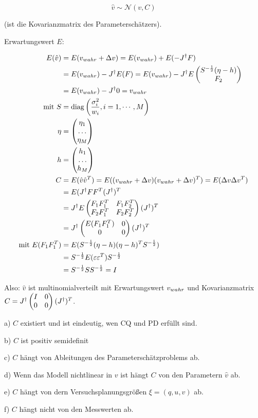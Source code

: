\[ \hat v \sim \mathcal N(v,C) \]

(ist die Kovarianzmatrix des Parameterschätzers).

Erwartungswert $E$:

\begin{align*}
E(\hat v) &= E(v_{wahr} + \Delta v) = E(v_{wahr}) + E(-J^\dagger F) \\
&= E(v_{wahr}) - J^\dagger E(F) = E(v_{wahr}) - J^\dagger E \begin{pmatrix} S^{-\frac 12} (\eta-h) \\ F_2 \end{pmatrix} \\
&= E(v_{wahr}) - J^\dagger 0 = v_{wahr} \\
\text{mit } S &= \mathrm{diag} \left( \frac{\sigma_i^2}{w_i}, i=1,\cdots,M \right) \\
\eta &= \begin{pmatrix} \eta_1 \\ \hdots \\ \eta_M \end{pmatrix} \\
h &= \begin{pmatrix} h_1 \\ \hdots \\ h_M \end{pmatrix} \\
C &= E(\hat v \hat v^T) = E( (v_{wahr} + \Delta v) (v_{wahr} + \Delta v)^T ) = E(\Delta v \Delta v^T) \\
&= E(J^\dagger F F^T (J^\dagger)^T \\
&= J^\dagger E \begin{pmatrix} F_1 F_1^T & F_1 F_2^T \\ F_2 F_1^T & F_2 F_2^T \end{pmatrix} (J^\dagger)^T \\
&= J^\dagger \begin{pmatrix} E(F_1 F_1^T) & 0 \\ 0 & 0 \end{pmatrix} (J^\dagger)^T \\
\text{mit } E(F_1 F_1^T) &= E( S^{-\frac 12} (\eta-h)(\eta-h)^T S^{-\frac 12}) \\
&= S^{-\frac 12} E(\varepsilon \varepsilon^T) S^{-\frac 12 } \\
&= S^{-\frac 12} S S^{-\frac 12} = I \\
\end{align*}

Also: $\hat v$ ist multinomialverteilt mit Erwartungswert $v_{wahr}$ und Kovarianzmatrix $C = J^\dagger \begin{pmatrix} I & 0 \\ 0 & 0 \end{pmatrix} (J^\dagger)^T$.


\bitm
\item a) $C$ existiert und ist eindeutig, wen CQ und PD erfüllt sind.
\item b) $C$ ist positiv semidefinit
\item c) $C$ hängt von Ableitungen des Parameterschätzproblems ab.
\item d) Wenn das Modell nichtlinear in $v$ ist hängt $C$ von den Parametern $\hat v$ ab.
\item e) $C$ hängt von dern Versuchsplanungsgrößen $\xi = (q,u,v)$ ab.
\item f) $C$ hängt nicht von den Messwerten ab.
\eitm

